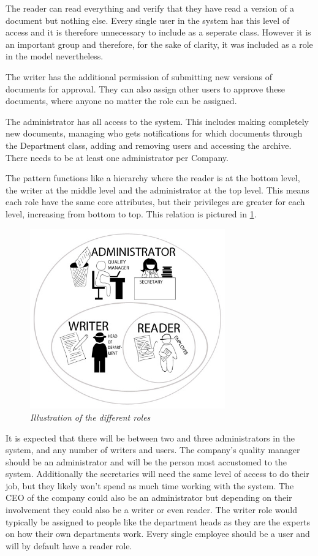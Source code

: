 The reader can read everything and verify that they have read a version of a document but nothing else.
Every single user in the system has this level of access and it is therefore unnecessary to include as a seperate class.
However it is an important group and therefore, for the sake of clarity, it was included as a role in the model nevertheless.

The writer has the additional permission of submitting new versions of documents for approval. They can also assign other users to approve these documents, where anyone no matter the role can be assigned.

The administrator has all access to the system.
This includes making completely new documents, managing who gets notifications for which documents through the Department class, adding and removing users and accessing the archive.
There needs to be at least one administrator per Company.

The pattern functions like a hierarchy where the reader is at the bottom level, the writer at the middle level and the administrator at the top level. This means each role have the same core attributes, but their privileges are greater for each level, increasing from bottom to top.
This relation is pictured in \cref{fig:RoleIllustration}.
\begin{figure}[H]
	\centering
	\includegraphics[width=0.75\textwidth]{billeder/RP-Roller2.jpg}
	\caption{\textit{Illustration of the different roles
	}\label{fig:RoleIllustration}}
\end{figure}

It is expected that there will be between two and three administrators in the system, and any number of writers and users.
The company's quality manager should be an administrator and will be the person most accustomed to the system.
Additionally the secretaries will need the same level of access to do their job, but they likely won't spend as much time working with the system.
The CEO of the company could also be an administrator but depending on their involvement they could also be a writer or even reader.
The writer role would typically be assigned to people like the department heads as they are the experts on how their own departments work.
Every single employee should be a user and will by default have a reader role.

